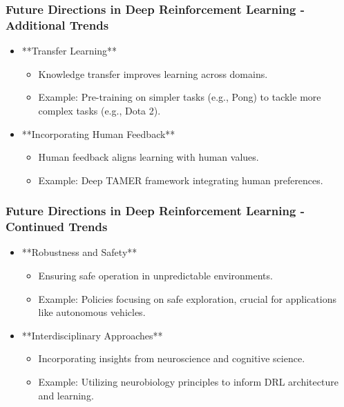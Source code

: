 \documentclass[aspectratio=169]{beamer}
\begin{document}
\begin{frame}[fragile]
    \frametitle{Future Directions in Deep Reinforcement Learning - Additional Trends}
    \begin{itemize}
        \item **Transfer Learning**
            \begin{itemize}
                \item Knowledge transfer improves learning across domains.
                \item Example: Pre-training on simpler tasks (e.g., Pong) to tackle more complex tasks (e.g., Dota 2).
            \end{itemize}
        \item **Incorporating Human Feedback**
            \begin{itemize}
                \item Human feedback aligns learning with human values.
                \item Example: Deep TAMER framework integrating human preferences.
            \end{itemize}
    \end{itemize}
\end{frame}

\begin{frame}[fragile]
    \frametitle{Future Directions in Deep Reinforcement Learning - Continued Trends}
    \begin{itemize}
        \item **Robustness and Safety**
            \begin{itemize}
                \item Ensuring safe operation in unpredictable environments.
                \item Example: Policies focusing on safe exploration, crucial for applications like autonomous vehicles.
            \end{itemize}
        \item **Interdisciplinary Approaches**
            \begin{itemize}
                \item Incorporating insights from neuroscience and cognitive science.
                \item Example: Utilizing neurobiology principles to inform DRL architecture and learning.
            \end{itemize}
    \end{itemize}
\end{frame}
\end{document}
